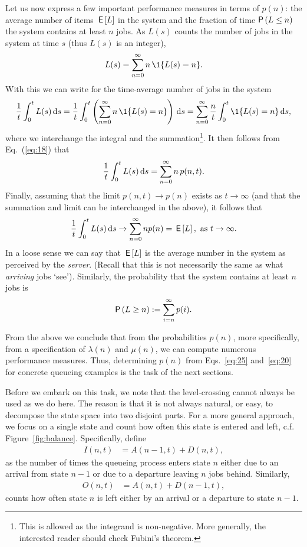 Let us now express a few important performance measures in terms of
$p(n)$: the average number of items $\,\mathsf{E}\left[L\right]$ in the system and the
fraction of time $\P{L\leq n}$ the system contains at least $n$ jobs.
As $L(s)$ counts the number of jobs in the system at time $s$ (thus
$L(s)$ is an integer),
\begin{equation*}
  L(s) = \sum_{n=0}^\infty n\, \1{L(s) = n}.
\end{equation*}
With this we can write for the time-average number of jobs in the system
\begin{equation}\label{eq:1}
\frac 1 t \int_0^t L(s) \d s = \frac 1 t \int_0^t \left(\sum_{n=0}^{\infty} n\, \1{L(s) = n}\right) \d s
= \sum_{n=0}^{\infty} \frac n t \int_0^t   \1{L(s) = n} \d s,
\end{equation}
where we interchange the integral and the summation\footnote{This is
  allowed as the integrand is non-negative. More generally, the
  interested reader should check Fubini's theorem.}.  It then follows
  from Eq.~(\ref{eq:18}) that
\begin{equation*}
\frac 1 t \int_0^t L(s) \,\text{d}s =  \sum_{n=0}^{\infty} n\, p(n,t).
\end{equation*}
Finally, assuming that the limit $p(n,t) \to p(n)$ exists as
$t\to\infty$ (and that the summation and limit can be interchanged in
the above), it follows that 
\begin{equation*}
\frac 1 t \int_0^t L(s) \,\text{d}s \to  \sum_{n=0}^\infty n p(n) = \,\mathsf{E}\left[L\right], \text{ as } t \to \infty.
\end{equation*}
In a loose sense we can say that
$\,\mathsf{E}\left[L\right]$ is the average number in the system as perceived by the
\emph{server}. (Recall that this is not necessarily the same as what
\emph{arriving} jobs `see').  Similarly, the probability that the
system contains at least $n$ jobs is 
\begin{equation*}
  \P{ L \geq n} := \sum_{i=n}^\infty p(i).
\end{equation*}

From the above we conclude that from the probabilities $p(n)$, more
specifically, from a specification of $\lambda(n)$ and $\mu(n)$, we
can compute numerous performance measures. Thus, determining $p(n)$
from Eqs.~\eqref{eq:25} and~\eqref{eq:20} for concrete queueing
examples is the task of the next sections.

Before we embark on this task, we note that the level-crossing cannot
always be used as we do here. The reason is that it is not always
natural, or easy, to decompose the state space into two disjoint
parts. For a more general approach, we focus on a single state and
count how often this state is entered and left,
c.f. Figure~\ref{fig:balance}. Specifically, define
\begin{align*}
  I(n,t) &= A(n-1,t) + D(n,t),
\end{align*}
as the number of times the queueing process enters state $n$ either
due to an arrival from state $n-1$ or due to a departure leaving $n$
jobs behind. Similarly,
\begin{align*}
 O(n,t) &= A(n,t) + D(n-1,t),
\end{align*}
counts how often state $n$ is left either by an arrival or a departure
to state $n-1$.

